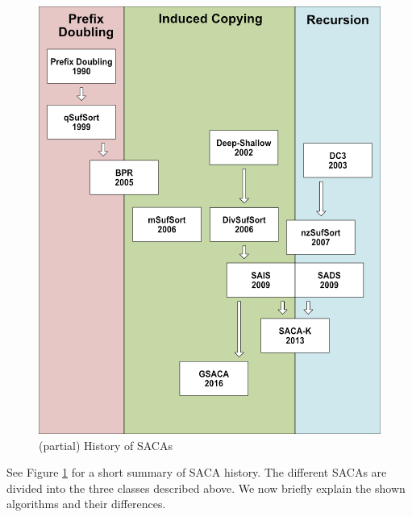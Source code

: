 \begin{figure}[!t]
    \includegraphics[width=\textwidth]{kapitel/5_saca_uebersicht/history/history3_eng.png}
    \caption{(partial) History of SACAs}
    \label{ea:fig:history}
\end{figure}

See Figure \ref{ea:fig:history} for a short summary of SACA history.
The different SACAs are divided into the three classes described above.
We now briefly explain the shown algorithms and their differences.


